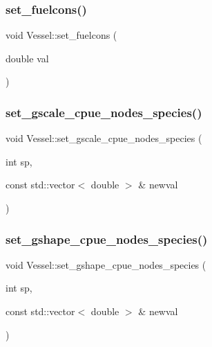 \subsubsection{\texorpdfstring{set\_fuelcons()}{set\_fuelcons()}}
{\footnotesize\ttfamily void Vessel\+::set\+\_\+fuelcons (\begin{DoxyParamCaption}\item[{double}]{val }\end{DoxyParamCaption})}

\mbox{\label{class_vessel_a25258e591be836659df7d1cd05b242c4}} 
\subsubsection{\texorpdfstring{set\_gscale\_cpue\_nodes\_species()}{set\_gscale\_cpue\_nodes\_species()}}
{\footnotesize\ttfamily void Vessel\+::set\+\_\+gscale\+\_\+cpue\+\_\+nodes\+\_\+species (\begin{DoxyParamCaption}\item[{int}]{sp,  }\item[{const std\+::vector$<$ double $>$ \&}]{newval }\end{DoxyParamCaption})}

\mbox{\label{class_vessel_a236436d0aa990712dc5d68a28e882a79}} 
\subsubsection{\texorpdfstring{set\_gshape\_cpue\_nodes\_species()}{set\_gshape\_cpue\_nodes\_species()}}
{\footnotesize\ttfamily void Vessel\+::set\+\_\+gshape\+\_\+cpue\+\_\+nodes\+\_\+species (\begin{DoxyParamCaption}\item[{int}]{sp,  }\item[{const std\+::vector$<$ double $>$ \&}]{newval }\end{DoxyParamCaption})}

\mbox{\label{class_vessel_a74602acff11603eb8b10a1d4ca387207}} 
